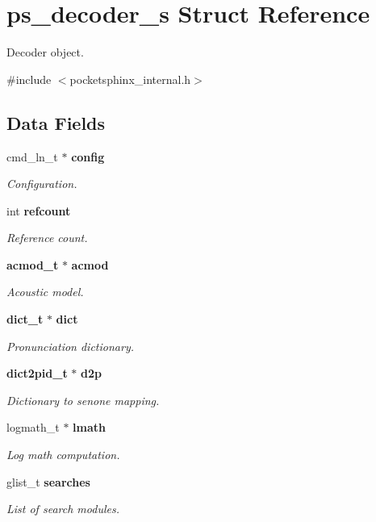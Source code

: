 \section{ps\-\_\-decoder\-\_\-s Struct Reference}
\label{structps__decoder__s}


Decoder object.  




{\ttfamily \#include $<$pocketsphinx\-\_\-internal.\-h$>$}

\subsection*{Data Fields}
\begin{DoxyCompactItemize}
\item 
cmd\-\_\-ln\-\_\-t $\ast$ {\bf config}
\begin{DoxyCompactList}\small\item\em Configuration. \end{DoxyCompactList}\item 
int {\bf refcount}
\begin{DoxyCompactList}\small\item\em Reference count. \end{DoxyCompactList}\item 
{\bf acmod\-\_\-t} $\ast$ {\bf acmod}
\begin{DoxyCompactList}\small\item\em Acoustic model. \end{DoxyCompactList}\item 
{\bf dict\-\_\-t} $\ast$ {\bf dict}
\begin{DoxyCompactList}\small\item\em Pronunciation dictionary. \end{DoxyCompactList}\item 
{\bf dict2pid\-\_\-t} $\ast$ {\bf d2p}
\begin{DoxyCompactList}\small\item\em Dictionary to senone mapping. \end{DoxyCompactList}\item 
logmath\-\_\-t $\ast$ {\bf lmath}
\begin{DoxyCompactList}\small\item\em Log math computation. \end{DoxyCompactList}\item 
glist\-\_\-t {\bf searches}
\begin{DoxyCompactList}\small\item\em List of search modules. \end{DoxyCompactList}\item 

\end{DoxyCompactItemize}
